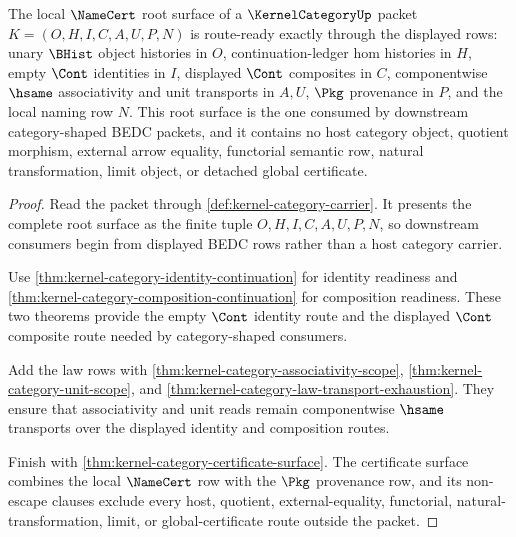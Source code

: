 \begin{theorem}
\label{thm:kernel-category-namecert-root-route-readiness}
The local $\NameCert$ root surface of a $\KernelCategoryUp$ packet $K=(O,H,I,C,A,U,P,N)$ is route-ready exactly through the displayed rows: unary $\BHist$ object histories in $O$, continuation-ledger hom histories in $H$, empty $\Cont$ identities in $I$, displayed $\Cont$ composites in $C$, componentwise $\hsame$ associativity and unit transports in $A,U$, $\Pkg$ provenance in $P$, and the local naming row $N$. This root surface is the one consumed by downstream category-shaped BEDC packets, and it contains no host category object, quotient morphism, external arrow equality, functorial semantic row, natural transformation, limit object, or detached global certificate.
\end{theorem}
\begin{proof}
Read the packet through \autoref{def:kernel-category-carrier}. It presents the complete root surface as the finite tuple $O,H,I,C,A,U,P,N$, so downstream consumers begin from displayed BEDC rows rather than a host category carrier.

Use \autoref{thm:kernel-category-identity-continuation} for identity readiness and \autoref{thm:kernel-category-composition-continuation} for composition readiness. These two theorems provide the empty $\Cont$ identity route and the displayed $\Cont$ composite route needed by category-shaped consumers.

Add the law rows with \autoref{thm:kernel-category-associativity-scope}, \autoref{thm:kernel-category-unit-scope}, and \autoref{thm:kernel-category-law-transport-exhaustion}. They ensure that associativity and unit reads remain componentwise $\hsame$ transports over the displayed identity and composition routes.

Finish with \autoref{thm:kernel-category-certificate-surface}. The certificate surface combines the local $\NameCert$ row with the $\Pkg$ provenance row, and its non-escape clauses exclude every host, quotient, external-equality, functorial, natural-transformation, limit, or global-certificate route outside the packet.
\end{proof}

